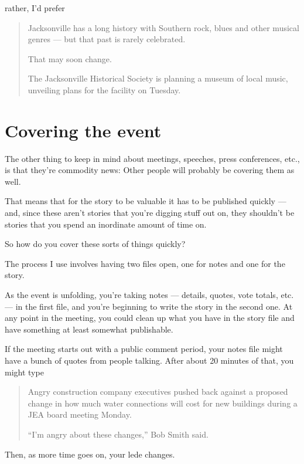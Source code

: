 \documentclass[
  12pt,
  american,
  letterpaperpaper,
  extrafontsizes,onecolumn,openright
  ]{memoir}
\begin{document}
rather, I'd prefer

\begin{quote}
Jacksonville has a long history with Southern rock, blues and other musical genres --- but that past is rarely celebrated.

That may soon change.

The Jacksonville Historical Society is planning a museum of local music, unveiling plans for the facility on Tuesday.
\end{quote}

\hypertarget{covering-the-event}{%
\section*{Covering the event}\label{covering-the-event}}

The other thing to keep in mind about meetings, speeches, press conferences, etc., is that they're commodity news: Other people will probably be covering them as well.

That means that for the story to be valuable it has to be published quickly --- and, since these aren't stories that you're digging stuff out on, they shouldn't be stories that you spend an inordinate amount of time on.

So how do you cover these sorts of things quickly?

The process I use involves having two files open, one for notes and one for the story.

As the event is unfolding, you're taking notes --- details, quotes, vote totals, etc. --- in the first file, and you're beginning to write the story in the second one. At any point in the meeting, you could clean up what you have in the story file and have something at least somewhat publishable.

If the meeting starts out with a public comment period, your notes file might have a bunch of quotes from people talking. After about 20 minutes of that, you might type

\begin{quote}
Angry construction company executives pushed back against a proposed change in how much water connections will cost for new buildings during a JEA board meeting Monday.

\enquote{I'm angry about these changes,} Bob Smith said.
\end{quote}

Then, as more time goes on, your lede changes.
\end{document}
